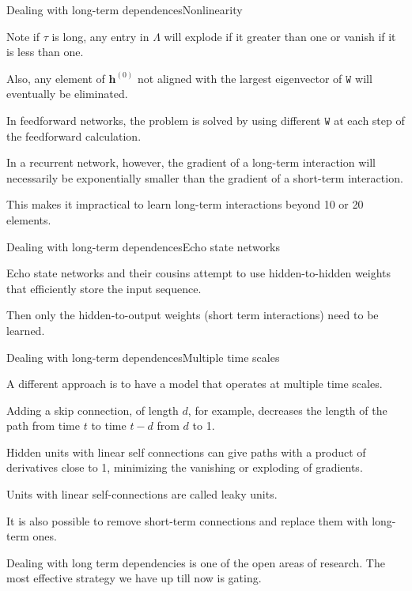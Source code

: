 \documentclass{beamer}
\renewcommand{\vec}[1]{\boldsymbol{#1}}
\newcommand{\mat}[1]{\mathtt{#1}}
\begin{document}
\begin{frame}{Dealing with long-term dependences}{Nonlinearity}

  Note if $\tau$ is long, any entry in $\mat{\Lambda}$ will explode if
  it greater than one or vanish if it is less than one.

  \medskip

  Also, any element of $\vec{h}^{(0)}$ not aligned with the largest
  eigenvector of $\mat{W}$ will eventually be eliminated.

  \medskip

  In feedforward networks, the problem is solved by using
  different $\mat{W}$ at each step of the feedforward calculation.

  \medskip

  In a recurrent network, however, the gradient of a long-term
  interaction will necessarily be exponentially smaller than the
  gradient of a short-term interaction.

  \medskip

  This makes it impractical to learn long-term interactions beyond 10 or
  20 elements.
  
\end{frame}


\begin{frame}{Dealing with long-term dependences}{Echo state networks}

  \alert{Echo state networks} and their cousins attempt to use
  hidden-to-hidden weights that efficiently store the input sequence.

  \medskip

  Then only the hidden-to-output weights (short term interactions)
  need to be learned.

\end{frame}


\begin{frame}{Dealing with long-term dependences}{Multiple time scales}

  A different approach is to have a model that operates at
  \alert{multiple time scales}.

  \medskip

  Adding a \alert{skip connection}, of length $d$, for example,
  decreases the length of the path from time $t$ to time $t-d$ from
  $d$ to 1.

  \medskip

  Hidden units with \alert{linear self connections} can give paths with
  a product of derivatives close to 1, minimizing the vanishing or
  exploding of gradients.

  \medskip
  
  Units with linear self-connections are called \alert{leaky units}.

  \medskip

  It is also possible to \alert{remove} short-term connections and
  replace them with long-term ones.

  \medskip

  Dealing with long term dependencies is one of the open areas of
  research.  The most effective strategy we have up till now is
  \alert{gating}.
  
\end{frame}
\end{document}
